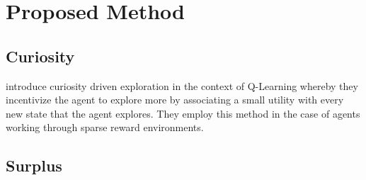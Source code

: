 \section{Proposed Method}

\subsection{Curiosity}
 introduce curiosity driven exploration in the context of Q-Learning whereby they incentivize the agent to explore more by associating a small utility with every new state that the agent explores. They employ this method in the case of agents working through sparse reward environments.
\subsection{Surplus}

